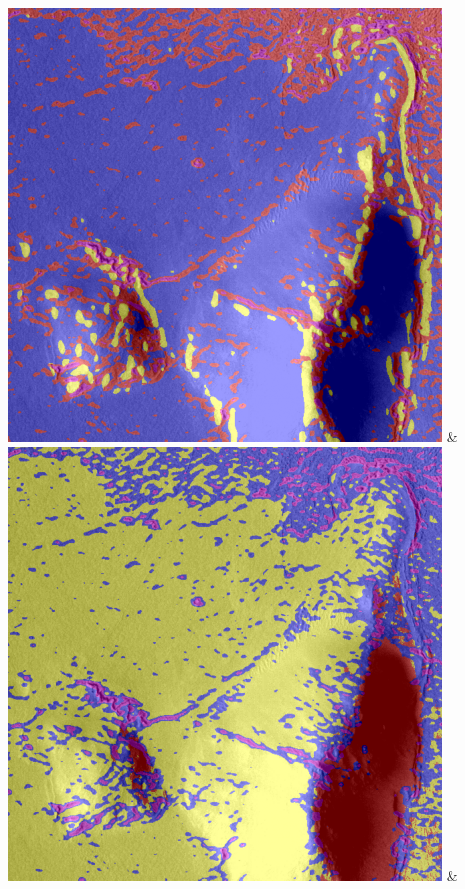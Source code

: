 \begin{table}[h!]
\begin{tabularx}{\textwidth}
		\includegraphics[width=0.9\linewidth]{images/gen/spatial_weight/p03_04.png_0.66.png} &
		\includegraphics[width=0.9\linewidth]{images/gen/spatial_weight/p03_04.png_1.00.png} &

\end{tabularx}
\end{table}
